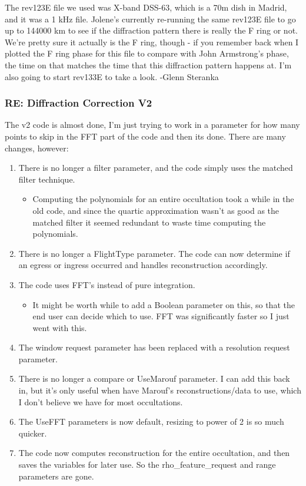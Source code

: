 \documentclass[crop=false,class=book]{standalone}
\begin{document}
The rev123E file we used was X-band DSS-63, which is a 70m dish in Madrid, and it was a 1 kHz file. Jolene’s currently re-running the same rev123E file to go up to 144000 km to see if the diffraction pattern there is really the F ring or not. We’re pretty sure it actually is the F ring, though - if you remember back when I plotted the F ring phase for this file to compare with John Armstrong’s phase, the time on that matches the time that this diffraction pattern happens at. I’m also going to start rev133E to take a look. -Glenn Steranka
\subsubsection{RE: Diffraction Correction V2}
The v2 code is almost done, I'm just trying to work in a parameter for how many points to skip in the FFT part of the code and then its done. There are many changes, however:
\begin{enumerate}
    \item There is no longer a filter parameter, and the code simply uses the matched filter technique.
    \begin{itemize}
        \item Computing the polynomials for an entire occultation took a while in the old code, and since the quartic approximation wasn't as good as the matched filter it seemed redundant to waste time computing the polynomials.
    \end{itemize}
    \item There is no longer a FlightType parameter. The code can now determine if an egress or ingress occurred and handles reconstruction accordingly.
    \item The code uses FFT's instead of pure integration.
    \begin{itemize}
        \item It might be worth while to add a Boolean parameter on this, so that the end user can decide which to use. FFT was significantly faster so I just went with this.
    \end{itemize}
    \item The window request parameter has been replaced with a resolution request parameter.
    \item There is no longer a compare or UseMarouf parameter. I can add this back in, but it's only useful when have Marouf's reconstructions/data to use, which I don't believe we have for most occultations.
    \item The UseFFT parameters is now default, resizing to power of 2 is so much quicker.
    \item The code now computes reconstruction for the entire occultation, and then saves the variables for later use. So the rho\_feature\_request and range parameters are gone.
\end{enumerate}
\end{document}
